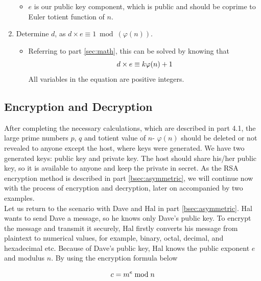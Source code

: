 \documentclass[a4paper, 12pt]{article}
\begin{document}
\begin{enumerate}
    \begin{itemize}
      \item $e$ is our public key component, which is public and should be coprime to Euler
totient function of $n$.
      \end{itemize}
  \item Determine $d$, as $d \times e \equiv 1 \bmod (\varphi(n))$.
    \begin{itemize}
    \item Referring to part \ref{sec:math}, this can be solved by knowing that
      \begin{equation*}
        d \times e \equiv k \varphi(n) + 1\\
        \end{equation*}
        All variables in the equation are positive integers.
      \end{itemize}
  \end{enumerate}

\subsection{Encryption and Decryption}
\label{bsec:ed}

After completing the necessary calculations, which are described in part 4.1, the large prime
numbers $p$, $q$ and totient value of $n$- $\varphi(n)$ should be deleted or not revealed to anyone except the
host, where keys were generated. We have two generated keys: public key and private key. The
host should share his/her public key, so it is available to anyone and keep the private in secret. As
the RSA encryption method is described in part \ref{bsec:asymmetric}, we will continue now with the process of
encryption and decryption, later on accompanied by two examples.\\

Let us return to the scenario with Dave and Hal in part \ref{bsec:asymmetric}. Hal wants to send Dave a message, so
he knows only Dave's public key. To encrypt the message and transmit it securely, Hal firstly
converts his message from plaintext to numerical values, for example, binary, octal, decimal, and
hexadecimal etc. Because of Dave's public key, Hal knows the public exponent $e$ and modulus $n$.
By using the encryption formula below

\begin{equation*}
  c = m^e \bmod n\\
  \end{equation*}
\end{document}
